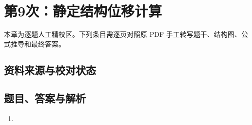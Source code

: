\chapter{第9次：静定结构位移计算}

本章为逐题人工精校区。下列条目需逐页对照原 PDF 手工转写题干、结构图、公式推导和最终答案。

\section{资料来源与校对状态}


\section{题目、答案与解析}

\begin{enumerate}[label=\textbf{第\arabic*题},wide]
  \item
  \begin{problemBox}
  \end{problemBox}

  \begin{solutionBox}
  \end{solutionBox}
\end{enumerate}
